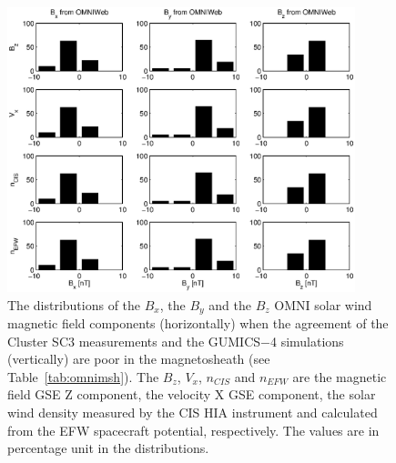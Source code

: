 \documentclass[linenumbers,draft]{agujournal}
\begin{document}
\begin{figure}[h]
\centering
\includegraphics[width=0.9\textwidth,angle=0]{swe-2020-corr-f17.eps}  
\caption{The distributions of the $B_{x}$, the $B_{y}$ and the $B_{z}$ OMNI solar wind magnetic field components (horizontally) when the agreement of the Cluster SC3 measurements and the GUMICS$-$4 simulations (vertically) are poor in the magnetosheath (see Table~\ref{tab:omnimsh}). The $B_{z}$, $V_{x}$, $n_{CIS}$ and $n_{EFW}$ are the magnetic field GSE Z component, the velocity X GSE component, the solar wind density measured by the CIS HIA instrument and calculated from the EFW spacecraft potential, respectively. The values are in percentage unit in the distributions.}
\label{fig:mshomnibxyz}
\end{figure}

\pagebreak
\end{document}
